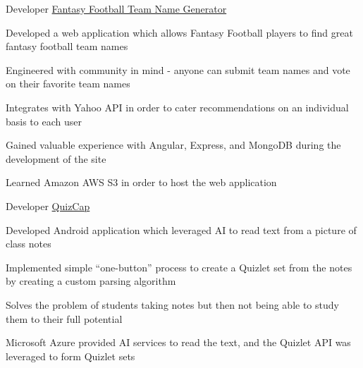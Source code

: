 

\begin{cventries}

  \cventry
    {Developer} %
    {{\href{http://fantasynamegenerator.s3-website.us-east-2.amazonaws.com/}{Fantasy Football Team Name Generator}}} %
    {} %
    {} %
    {
      \begin{cvitems} %
        \item {Developed a web application which allows Fantasy Football players to find great fantasy football team names}
        \item {Engineered with community in mind - anyone can submit team names and vote on their favorite team names}
        \item {Integrates with Yahoo API in order to cater recommendations on an individual basis to each user}
        \item {Gained valuable experience with Angular, Express, and MongoDB during the development of the site}
        \item {Learned Amazon AWS S3 in order to host the web application}
      \end{cvitems}
    }

  \cventry
    {Developer} %
    {{\href{https://github.com/TilakPatel/QuizCap-App}{QuizCap}}} %
    {} %
    {} %
    {
      \begin{cvitems} %
        \item {Developed Android application which leveraged AI to read text from a picture of class notes}
        \item {Implemented simple ``one-button'' process to create a Quizlet set from the notes by creating a custom parsing algorithm}
        \item {Solves the problem of students taking notes but then not being able to study them to their full potential}
        \item {Microsoft Azure provided AI services to read the text, and the Quizlet API was leveraged to form Quizlet sets}
      \end{cvitems}
    }

\end{cventries}
